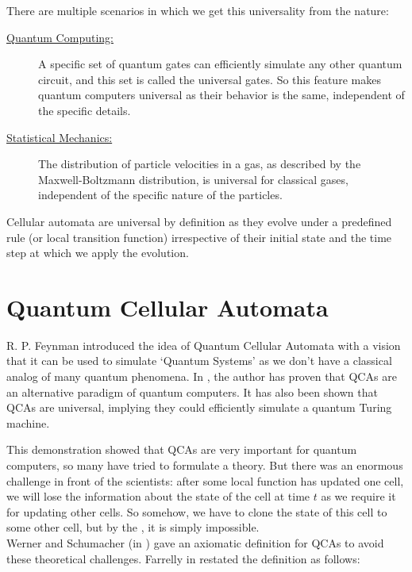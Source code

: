 \documentclass[11pt, oneside, listof=totoc]{scrbook}
\begin{document}
\noindent There are multiple scenarios in which we get this universality from the nature:
\begin{description}
    \item[\normalfont\sffamily \uline{Quantum Computing:}] A specific set of quantum gates can efficiently simulate any other quantum circuit, and this set is called the universal gates. So this feature makes quantum computers universal as their behavior is the same, independent of the specific details.

    \item[\normalfont\sffamily \uline{Statistical Mechanics:}] The distribution of particle velocities in a gas, as described by the Maxwell-Boltzmann distribution, is universal for classical gases, independent of the specific nature of the particles.
\end{description}

Cellular automata are universal by definition as they evolve under a predefined rule (or local transition function) irrespective of their initial state and the time step at which we apply the evolution.

\section{Quantum Cellular Automata}
R. P. Feynman introduced the idea of Quantum Cellular Automata with a vision that it can be used to simulate `Quantum Systems' as we don't have a classical analog of many quantum phenomena. In \cite{Watrous1995}, the author has proven that QCAs are an alternative paradigm of quantum computers. It has also been shown that QCAs are universal, implying they could efficiently simulate a quantum Turing machine.

This demonstration showed that QCAs are very important for quantum computers, so many have tried to formulate a theory. But there was an enormous challenge in front of the scientists: after some local function has updated one cell, we will lose the information about the state of the cell at time \(t\) as we require it for updating other cells. So somehow, we have to clone the state of this cell to some other cell, but by the , it is simply impossible.\\

Werner and Schumacher (in \cite{Werner2004}) gave an axiomatic definition for QCAs to avoid these theoretical challenges. Farrelly in \cite{Farrelly2019} restated the definition as follows:
\end{document}

